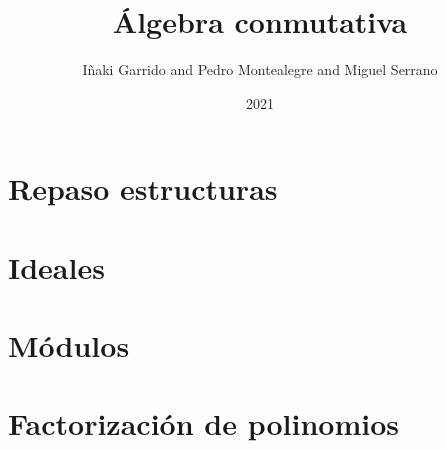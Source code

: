 \documentclass[a4paper,12pt]{book}
\title{Álgebra conmutativa}
\author{Iñaki Garrido and Pedro Montealegre and Miguel Serrano}
\date{2021}
\theoremstyle{definition}
\begin{document}
\maketitle
\chapter{Repaso estructuras}

\chapter{Ideales}

\chapter{Módulos}

\appendix
\chapter{Factorización de polinomios}

\end{document}
